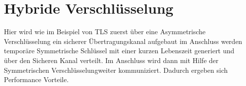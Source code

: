 
\chapter{Hybride Verschlüsselung} %



Hier wird wie im Beispiel von TLS zuerst über eine Asymmetrische Verschlüsselung ein sicherer Übertragungskanal aufgebaut im Anschluss werden temporäre Symmetrische Schlüssel mit einer kurzen Lebenszeit generiert und über den Sicheren Kanal verteilt. Im Anschluss wird dann mit Hilfe der Symmetrischen Verschlüsselungweiter kommuniziert. Dadurch ergeben sich Performance Vorteile.

